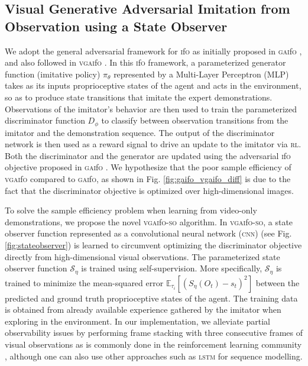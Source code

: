 \documentclass[letterpaper, 10 pt, conference]{ieeeconf}  %
\newcommand{\gaifo}{\textsc{gai}f\textsc{o}}
\newcommand{\ifo}{\textsc{i}f\textsc{o}}
\newcommand{\vgaifo}{\textsc{vgai}f\textsc{o}}
\newcommand{\vgaifoso}{\textsc{vgai}f\textsc{o}-\textsc{so}}
\newcommand{\rl}{\textsc{rl}}
\newcommand{\cnn}{\textsc{cnn}}
\begin{document}
\subsection{Visual Generative Adversarial Imitation from Observation using a State Observer}

We adopt the general adversarial framework for \ifo{} as initially proposed in \gaifo{} \cite{gaifo}, and also followed in \vgaifo{} \cite{gaifo_proprio}. In this \ifo{} framework, a parameterized generator function (imitative policy) $\pi_\theta$ represented by a Multi-Layer Perceptron (MLP) takes as its inputs proprioceptive states of the agent and acts in the environment, so as to produce state transitions that imitate the expert demonstrations. Observations of the imitator's behavior are then used to train the parameterized discriminator function $D_\phi$ to classify between observation transitions from the imitator and the demonstration sequence. The output of the discriminator network is then used as a reward signal to drive an update to the imitator via \rl{}. Both the discriminator and the generator are updated using the adversarial \ifo{} objective proposed in \gaifo{} \cite{gaifo}. We hypothesize that the poor sample efficiency of \vgaifo{} compared to \gaifo{}, as shown in Fig. \ref{fig:gaifo_vgaifo_diff} is due to the fact that the discriminator objective is optimized over high-dimensional images. 

To solve the sample efficiency problem when learning from video-only demonstrations, we propose the novel \vgaifoso{} algorithm. In \vgaifoso{}, a state observer function represented as a convolutional neural network (\cnn{}) (see Fig.\ref{fig:stateobserver}) is learned to circumvent optimizing the discriminator objective directly from high-dimensional visual observations. The parameterized state observer function $\mathcal{S}_\eta$ is trained using self-supervision. More specifically, $\mathcal{S}_\eta$ is trained to minimize the mean-squared error $\mathbb{E}_{\tau_{i}}[(S_\eta(O_t) - s_t)^2]$ between the predicted and ground truth proprioceptive states of the agent. The training data is obtained from already available experience gathered by the imitator when exploring in the environment. In our implementation, we alleviate partial observability issues by performing frame stacking with three consecutive frames of visual observations as is commonly done in the reinforcement learning community \cite{dqn}, although one can also use other approaches such as \textsc{lstm} \cite{lstm} for sequence modelling. 
\end{document}

